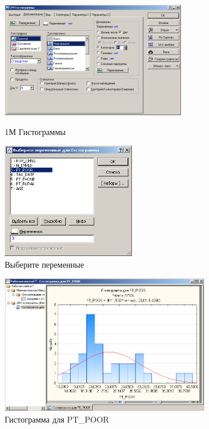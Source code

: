 \begin{figure}[!h]
  \centering
  \begin{minipage}{0.49\textwidth}
    \centering

    \includegraphics[height=5cm]
    {inc/example_7.PNG}

    \caption{1М Гистограммы}
    \label{fig:example_7}
  \end{minipage}
  \begin{minipage}{0.49\textwidth}
    \centering

    \includegraphics[height=5cm]
    {inc/example_8.PNG}

    \caption{Выберите переменные}
    \label{fig:example_8}
  \end{minipage}
\end{figure}

\begin{figure}[!h]
  \centering

  \includegraphics[height=6cm]
  {inc/example_9.PNG}

  \caption{Гистограмма для PT\_POOR}

  \label{fig:example_9}
\end{figure}

